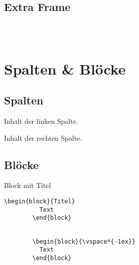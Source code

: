   \subsection{Extra Frame}
  \begin{frame}[fragile]{\subsecname}

    \begin{lstlisting}[gobble=6]
      % Option [fragile] ist erforderlich!

      
    \end{lstlisting}

  \end{frame}

\section{Spalten \& Blöcke}

  \subsection{Spalten}
  \begin{frame}{\subsecname}

    \begin{minipage}[t]{0.5\textwidth}
      \par\medskip
      Inhalt der linken Spalte.
    \end{minipage}%
    \begin{minipage}[t]{0.5\textwidth}
      \par\medskip
      Inhalt der rechten Spalte.
    \end{minipage}

  \end{frame}

  \subsection{Blöcke}
  \begin{frame}[fragile]{\subsecname}

    \begin{block}{Block mit Titel}
      \begin{lstlisting}[gobble=8]
        \begin{block}{Titel}
          Text
        \end{block}
      \end{lstlisting}
    \end{block}

    \begin{block}{\vspace*{-1ex}}
      \begin{lstlisting}[gobble=8]
        % Block ohne Titel

        \begin{block}{\vspace*{-1ex}}
          Text
        \end{block}
      \end{lstlisting}
    \end{block}

  \end{frame}

